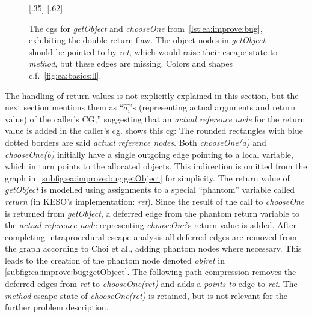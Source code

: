 			\begin{figure}
				\centering%
				{%
						\centering%
				}%
				\hspace{\fill}%
				{%
						\centering%
				}%
				\caption[The \glspl{cg} for \emph{getObject} and \emph{chooseOne} exhibiting the double return flaw]{%
					The \glspl{cg} for \emph{getObject} and \emph{chooseOne} from~\cref{lst:ea:improve:bug}, exhibiting the
					double return flaw. The object nodes in \emph{getObject} should be pointed-to by \emph{ret}, which would
					raise their escape state to \emph{method}, but these edges are missing. Colors and shapes
					c.f.~\cref{fig:ea:basics:ll}.}%
				\label{fig:ea:improve:bug}%
			\end{figure}

			The handling of return values is not explicitly explained in this section, but the next section mentions them as
			\enquote{$\hat{a_i}$'s (representing actual arguments and return value) of the caller's CG,}
			\cite[p.~891]{choi:03:toplas} suggesting that an \emph{actual reference node} for the return value is added in the
			caller's \gls{cg}.  shows this \acrlong{cg}: The rounded rectangles with
			blue dotted borders are said \emph{actual reference nodes}. Both \emph{chooseOne(a)} and \emph{chooseOne(b)}
			initially have a single outgoing edge pointing to a local variable, which in turn points to the allocated objects.
			This indirection is omitted from the graph in~\cref{subfig:ea:improve:bug:getObject} for simplicity. The return
			value of \emph{getObject} is modelled using assignments to a special \enquote{phantom} variable called
			\emph{return} (in KESO's implementation: \emph{ret}). Since the result of the call to \emph{chooseOne} is returned
			from \emph{getObject}, a deferred edge from the phantom return variable to the \emph{actual reference node}
			representing \emph{chooseOne}'s return value is added. After completing intraprocedural escape analysis all
			deferred edges are removed from the graph according to Choi et al., adding phantom nodes where necessary. This
			leads to the creation of the phantom node denoted \emph{objret} in \cref{subfig:ea:improve:bug:getObject}. The
			following path compression removes the deferred edges from \emph{ret} to \emph{chooseOne(ret)} and adds
			a \emph{points-to} edge to \emph{ret}. The \emph{method} escape state of \emph{chooseOne(ret)} is retained, but is
			not relevant for the further problem description.

